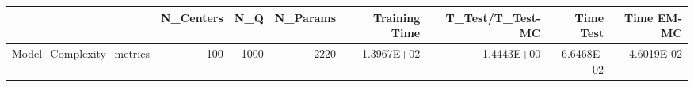 \begin{tabular}{lrrrrrrr}
\toprule
{} &  N\_Centers &   N\_Q &  N\_Params &  Training Time &  T\_Test/T\_Test-MC &  Time Test &  Time EM-MC \\
\midrule
Model\_Complexity\_metrics &        100 &  1000 &      2220 &     1.3967E+02 &        1.4443E+00 & 6.6468E-02 &  4.6019E-02 \\
\bottomrule
\end{tabular}
